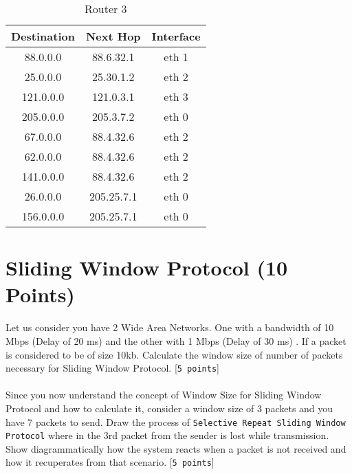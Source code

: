 \documentclass{scrartcl}
\begin{document}
\begin{table}[h]
\centering
\caption{Router 3}
\label{Router 3}
\begin{tabular}{ccc}
\hline
\multicolumn{1}{|c|}{\textbf{Destination}} & \multicolumn{1}{c|}{\textbf{Next Hop}} & \multicolumn{1}{c|}{\textbf{Interface}} \\ \hline
88.0.0.0                                   & 88.6.32.1                              & eth 1                                   \\
25.0.0.0                                   & 25.30.1.2                              & eth 2                                   \\
121.0.0.0                                  & 121.0.3.1                              & eth 3                                   \\
205.0.0.0                                  & 205.3.7.2                              & eth 0                                   \\
67.0.0.0                                   & 88.4.32.6                              & eth 2                                   \\
62.0.0.0                                   & 88.4.32.6                              & eth 2                                   \\
141.0.0.0                                  & 88.4.32.6                              & eth 2                                   \\
26.0.0.0                                   & 205.25.7.1                             & eth 0                                   \\
156.0.0.0                                  & 205.25.7.1                             & eth 0                                  
\end{tabular}
\end{table}
\newpage



\section{Sliding Window Protocol (10 Points)}

Let us consider you have 2 Wide Area Networks. One with a bandwidth of 10 Mbps (Delay of 20 ms) and the other with 1 Mbps (Delay of 30 ms) . If a packet is considered to be of size 10kb. Calculate the window size of number of packets necessary for Sliding Window Protocol. [\texttt{5 points}]\\ \\
Since you now understand the concept of Window Size for Sliding Window Protocol and how to calculate it, consider a window size of 3 packets and you have 7 packets to send. Draw the process of \texttt{Selective Repeat Sliding Window Protocol} where in the 3rd packet from the sender is lost while transmission. Show diagrammatically how the system reacts when a packet is not received and how it recuperates from that scenario. [\texttt{5 points}] \\
\end{document}
